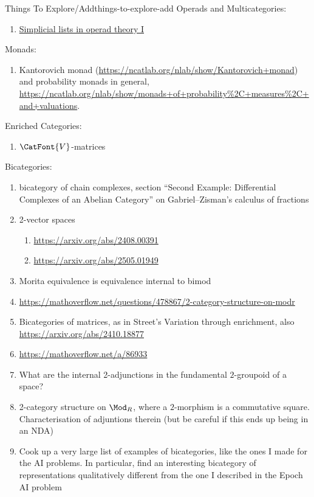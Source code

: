 \begin{remark}{Things To Explore/Add}{things-to-explore-add}
    Operads and Multicategories:
    \begin{enumerate}
        \item \href{https://arxiv.org/abs/2405.10072}{Simplicial lists in operad theory I}
    \end{enumerate}
    Monads:
    \begin{enumerate}
        \item Kantorovich monad (\url{https://ncatlab.org/nlab/show/Kantorovich+monad}) and probability monads in general, \url{https://ncatlab.org/nlab/show/monads+of+probability\%2C+measures\%2C+and+valuations}.
    \end{enumerate}
    Enriched Categories:
    \begin{enumerate}
        \item $\CatFont{V}$-matrices
    \end{enumerate}
    Bicategories:
    \begin{enumerate}
        \item bicategory of chain complexes, section ``Second Example: Differential Complexes of an Abelian Category'' on Gabriel--Zisman's calculus of fractions
        \item 2-vector spaces
            \begin{enumerate}
                \item \url{https://arxiv.org/abs/2408.00391}
                \item \url{https://arxiv.org/abs/2505.01949}
            \end{enumerate}
        \item Morita equivalence is equivalence internal to bimod
        \item \url{https://mathoverflow.net/questions/478867/2-category-structure-on-modr}
        \item Bicategories of matrices, as in Street's Variation through enrichment, also \url{https://arxiv.org/abs/2410.18877}
        \item \url{https://mathoverflow.net/a/86933}
        \item What are the internal 2-adjunctions in the fundamental $2$-groupoid of a space?
        \item 2-category structure on $\Mod_{R}$, where a $2$-morphism is a commutative square. Characterisation of adjuntions therein (but be careful if this ends up being in an NDA)
        \item Cook up a very large list of examples of bicategories, like the ones I made for the AI problems. In particular, find an interesting bicategory of representations qualitatively different from the one I described in the Epoch AI problem

\end{enumerate}
\end{remark}
